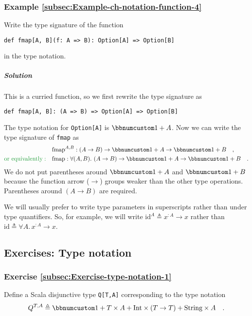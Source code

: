 \subsubsection{Example \label{subsec:Example-ch-notation-function-4}\ref{subsec:Example-ch-notation-function-4}}

Write the type signature of the function
\begin{lstlisting}
def fmap[A, B](f: A => B): Option[A] => Option[B]
\end{lstlisting}
in the type notation.

\subparagraph{Solution}

This is a curried function, so we first rewrite the type signature
as
\begin{lstlisting}
def fmap[A, B]: (A => B) => Option[A] => Option[B]
\end{lstlisting}
The type notation for \lstinline!Option[A]! is $\bbnum 1+A$. Now
we can write the type signature of \lstinline!fmap! as
\begin{align*}
 & \text{fmap}^{A,B}:\left(A\rightarrow B\right)\rightarrow\bbnum 1+A\rightarrow\bbnum 1+B\quad,\\
{\color{greenunder}\text{or equivalently}:}\quad & \text{fmap}:\forall(A,B).\,\left(A\rightarrow B\right)\rightarrow\bbnum 1+A\rightarrow\bbnum 1+B\quad.
\end{align*}
We do not put parentheses around $\bbnum 1+A$ and $\bbnum 1+B$ because
the function arrow ($\rightarrow$) groups weaker than the other type
operations. Parentheses around $\left(A\rightarrow B\right)$ are
required.

We will usually prefer to write type parameters in superscripts rather
than under type quantifiers. So, for example, we will write $\text{id}^{A}\triangleq x^{:A}\rightarrow x$
rather than $\text{id}\triangleq\forall A.\,x^{:A}\rightarrow x$.

\subsection{Exercises: Type notation}

\subsubsection{Exercise \label{subsec:Exercise-type-notation-1}\ref{subsec:Exercise-type-notation-1}}

Define a Scala disjunctive type \lstinline!Q[T,A]! corresponding
to the type notation
\[
Q^{T,A}\triangleq\bbnum 1+T\times A+\text{Int}\times(T\rightarrow T)+\text{String}\times A\quad.
\]


